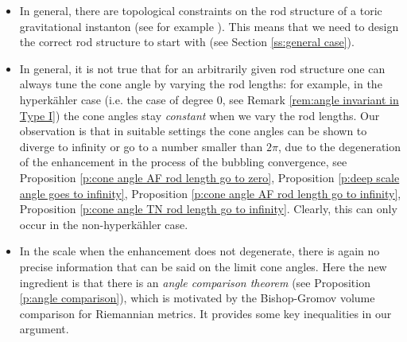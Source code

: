 \documentclass[a4paper,11pt]{amsart}
\theoremstyle{definition}
\numberwithin{equation}{section}
\begin{document}
\begin{itemize}
    \item In general, there are topological constraints on the rod structure of a toric gravitational instanton (see for example \cite{Nilsson}). This  means that we need to design the correct rod structure to start with (see Section \ref{ss:general case}). 
    \item  In general, it is not true that for an arbitrarily given rod structure one can always tune the cone angle by varying the rod lengths: for example, in the  hyperk\"ahler case (i.e. the case of degree $0$, see Remark \ref{rem:angle invariant in Type I}) the cone angles stay \emph{constant} when we vary the rod lengths. Our observation is that in suitable settings the cone angles can be shown to diverge to infinity or go to a number smaller than $2\pi$, due to the degeneration of the enhancement in the process of the bubbling convergence, see Proposition \ref{p:cone angle AF rod length go to zero}, Proposition \ref{p:deep scale angle goes to infinity}, Proposition \ref{p:cone angle AF rod length go to infinity}, Proposition \ref{p:cone angle TN rod length go to infinity}. Clearly, this can only occur in the non-hyperk\"ahler case. 
    \item In the scale when the enhancement does not degenerate, there is again no precise information that can be said on the limit cone angles. Here the new ingredient is that there is an \emph{angle comparison theorem} (see Proposition \ref{p:angle comparison}), which is motivated by the Bishop-Gromov volume comparison for Riemannian metrics. It provides some key inequalities in our argument.
\end{itemize}

\
\end{document}
